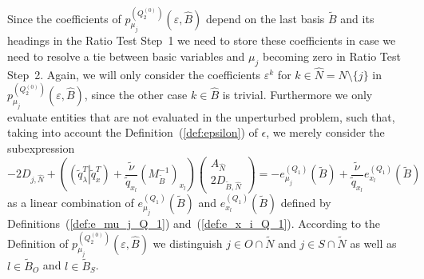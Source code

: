 \documentclass[a4paper]{article}
\newcommand{\pmu}[2]{\ensuremath{p_{\mu_{j}}^{(#1)}(\varepsilon, #2)}}
\begin{document}
Since the coefficients of \pmu{Q_{2}^{(0)}}{\hat{B}} depend on
the last basis $\tilde{B}$ and its headings in the Ratio Test Step~1 we need
to store these coefficients in case we need to resolve a tie between basic
variables and $\mu_{j}$ becoming zero in Ratio Test Step~2.
Again, we will only consider the coefficients
$\varepsilon^{k}$ for $k \in \hat{N}= N \setminus \{j\}$ in
\pmu{Q_{2}^{(0)}}{\hat{B}}, since the other case $k \in \hat{B}$
is trivial. Furthermore we only evaluate entities that are not evaluated in the
unperturbed problem, such that, taking into account the
Definition~(\ref{def:epsilon}) of $\epsilon$, 
we merely consider the subexpression
\begin{equation*}
-2D_{j, \hat{N}}
+\left(
   \left(\tilde{q}_{\lambda}^{T} \left| \right. \tilde{q}_{x}^{T}\right)
     + \frac{\tilde{\nu}}{\tilde{q}_{x_{l}}}
     \left(M_{\tilde{B}}^{-1}\right)_{x_{l}}
   \right)
   \left(\begin{array}{c}
              A_{\hat{N}} \\
	      \hline
	      2D_{\tilde{B}, \hat{N}}
	 \end{array}
   \right)
=
-e_{\mu_{j}}^{(Q_{1})}(\tilde{B})
+\frac{\tilde{\nu}}{\tilde{q}_{x_{l}}}e_{x_{l}}^{(Q_{1})}(\tilde{B})
\end{equation*}
as a linear combination of $e_{\mu_{j}}^{(Q_{1})}(\tilde{B})$ and
$e_{x_{l}}^{(Q_{1})}(\tilde{B})$ defined by
Definitions~(\ref{def:e_mu_j_Q_1}) and~(\ref{def:e_x_i_Q_1}).
According to the Definition of
\pmu{Q_{2}^{(0)}}{\hat{B}} we distinguish $j \in O \cap \tilde{N}$
and $j \in S \cap \tilde{N}$ as well as $l \in \tilde{B}_{O}$ and
$l \in \tilde{B}_{S}$.
\end{document}
